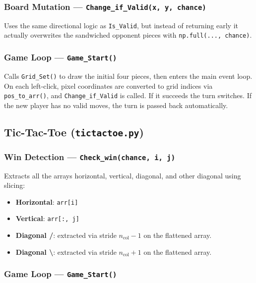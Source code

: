 \documentclass[12pt]{article}
\begin{document}
\subsubsection{Board Mutation --- \texttt{Change\_if\_Valid(x, y, chance)}}
 
Uses the same directional logic as \texttt{Is\_Valid}, but instead of returning early it actually overwrites the sandwiched opponent pieces with \texttt{np.full(..., chance)}.
 
\subsubsection{Game Loop --- \texttt{Game\_Start()}}
 
Calls \texttt{Grid\_Set()} to draw the initial four pieces, then enters the main event loop. On each left-click, pixel coordinates are converted to grid indices via \texttt{pos\_to\_arr()}, and \texttt{Change\_if\_Valid} is called. If it succeeds the turn switches. If the new player has no valid moves, the turn is passed back automatically.
 
\subsection{Tic-Tac-Toe (\texttt{tictactoe.py})}
 
\subsubsection{Win Detection --- \texttt{Check\_win(chance, i, j)}}
 
Extracts all the arrays horizontal, vertical, diagonal, and other diagonal using slicing:
\begin{itemize}
    \item \textbf{Horizontal}: \texttt{arr[i]}
    \item \textbf{Vertical}: \texttt{arr[:, j]}
    \item \textbf{Diagonal /}: extracted via stride $n_{\text{col}}-1$ on the flattened array.
    \item \textbf{Diagonal \textbackslash}: extracted via stride $n_{\text{col}}+1$ on the flattened array.
\end{itemize}
 
\subsubsection{Game Loop --- \texttt{Game\_Start()}}
 
\end{document}
